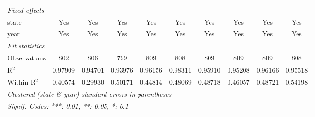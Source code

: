 \documentclass{article}
\begin{document}
\begin{landscape}
\begin{longtable}{@{\extracolsep{5pt}}lccccccccc}
   \midrule
   \emph{Fixed-effects}\\
   state                & Yes                           & Yes                     & Yes                           & Yes                          & Yes                         & Yes                          & Yes                     & Yes                           & Yes\\  
   year                 & Yes                           & Yes                     & Yes                           & Yes                          & Yes                         & Yes                          & Yes                     & Yes                           & Yes\\  
   \midrule
   \emph{Fit statistics}\\
   Observations         & 802                           & 806                     & 799                           & 809                          & 808                         & 809                          & 809                     & 809                           & 808\\  
   R$^2$                & 0.97909                       & 0.94701                 & 0.93976                       & 0.96156                      & 0.98311                     & 0.95910                      & 0.95208                 & 0.96166                       & 0.95518\\  
   Within R$^2$         & 0.40574                       & 0.29930                 & 0.50171                       & 0.44814                      & 0.48069                     & 0.48718                      & 0.46057                 & 0.48721                       & 0.54198\\  
   \midrule \midrule
   \multicolumn{10}{l}{\emph{Clustered (state \& year) standard-errors in parentheses}}\\
   \multicolumn{10}{l}{\emph{Signif. Codes: ***: 0.01, **: 0.05, *: 0.1}}\\
\end{longtable}
\end{landscape}
\restoregeometry
\end{document}
